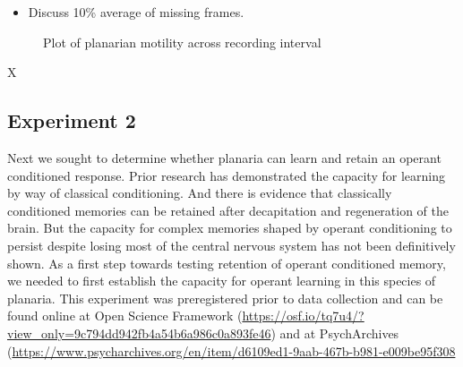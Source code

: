 \documentclass[
  letterpaper,
  DIV=11,
  numbers=noendperiod,
  oneside]{scrartcl}
\providecommand{\tightlist}{%
  \setlength{\itemsep}{0pt}\setlength{\parskip}{0pt}}\usepackage{longtable,booktabs,array}
\begin{document}
\begin{itemize}
\tightlist
\item
  Discuss 10\% average of missing frames.
\end{itemize}

\begin{figure}


\caption{\label{fig-ridgeplot}Plot of planarian motility across
recording interval}

\end{figure}%

X

\subsection{Experiment 2}\label{experiment-2}

Next we sought to determine whether planaria can learn and retain an
operant conditioned response. Prior research has demonstrated the
capacity for learning by way of classical conditioning. And there is
evidence that classically conditioned memories can be retained after
decapitation and regeneration of the brain. But the capacity for complex
memories shaped by operant conditioning to persist despite losing most
of the central nervous system has not been definitively shown. As a
first step towards testing retention of operant conditioned memory, we
needed to first establish the capacity for operant learning in this
species of planaria. This experiment was preregistered prior to data
collection and can be found online at Open Science Framework
(\url{https://osf.io/tq7u4/?view_only=9c794dd942fb4a54b6a986c0a893fe46})
and at PsychArchives
(\url{https://www.psycharchives.org/en/item/d6109ed1-9aab-467b-b981-e009be95f308}
\end{document}
